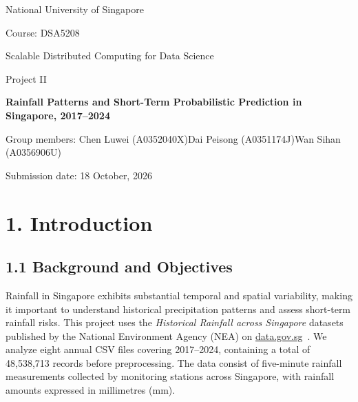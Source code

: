 \documentclass[11pt,a4paper]{article}
\begin{document}
\hypersetup{pageanchor=false}
\begin{titlepage}
\centering
\vspace*{25mm}
{\large National University of Singapore\par}
\vspace{15mm}
{\large Course: DSA5208\par}
\vspace{3mm}
{\large Scalable Distributed Computing for Data Science\par}
\vspace{3mm}
{\large Project II\par}
\vspace{20mm}
{\Large\bfseries Rainfall Patterns and Short-Term Probabilistic Prediction in Singapore, 2017–2024\par}
\vspace{20mm}
{\small Group members: Chen Luwei (A0352040X)\quad Dai Peisong (A0351174J)\quad Wan Sihan (A0356906U)\par}
\vfill
{\large Submission date: 18 October, 2026\par}
\vspace*{15mm}
\end{titlepage}
\hypersetup{pageanchor=true,linktoc=all}
\begingroup
\setlength{\parskip}{0pt}
\tableofcontents
\endgroup
\clearpage
{}


\FloatBarrier

\section*{1. Introduction}
{}


\subsection*{1.1 Background and Objectives}
{}


Rainfall in Singapore exhibits substantial temporal and spatial variability, making it important to understand historical precipitation patterns and assess short-term rainfall risks. This project uses the \textit{Historical Rainfall across Singapore} datasets published by the National Environment Agency (NEA) on \href{https://data.gov.sg/collections/2279/view}{data.gov.sg}~\citep{nea_rainfall}. We analyze eight annual CSV files covering 2017–2024, containing a total of 48,538,713 records before preprocessing. The data consist of five-minute rainfall measurements collected by monitoring stations across Singapore, with rainfall amounts expressed in millimetres (mm).
\end{document}
